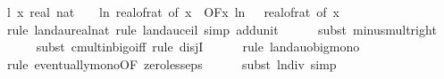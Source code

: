 \begin{isabellebody}
\ l{}{\isacharcolon}{\kern0pt}\ {\isachardoublequoteopen}{\isacharparenleft}{\kern0pt}{\isasymlambda}x{\isachardot}{\kern0pt}\ real\ {\isacharparenleft}{\kern0pt}nat\ {\isasymlceil}{\isacharminus}{\kern0pt}\ {\isacharparenleft}{\kern0pt}{}{}\ {\isacharasterisk}{\kern0pt}\ ln\ {\isacharparenleft}{\kern0pt}real{\isacharunderscore}{\kern0pt}of{\isacharunderscore}{\kern0pt}rat\ {\isacharparenleft}{\kern0pt}{\isasymepsilon}{\isacharunderscore}{\kern0pt}of\ x{\isacharparenright}{\kern0pt}{\isacharparenright}{\kern0pt}{\isacharparenright}{\kern0pt}{\isasymrceil}{\isacharparenright}{\kern0pt}{\isacharparenright}{\kern0pt}\ {\isasymin}\ O{\isacharbrackleft}{\kern0pt}{\isacharquery}{\kern0pt}F{\isacharbrackright}{\kern0pt}{\isacharparenleft}{\kern0pt}{\isasymlambda}x{\isachardot}{\kern0pt}\ ln\ {\isacharparenleft}{\kern0pt}{}\ {\isacharslash}{\kern0pt}\ real{\isacharunderscore}{\kern0pt}of{\isacharunderscore}{\kern0pt}rat\ {\isacharparenleft}{\kern0pt}{\isasymepsilon}{\isacharunderscore}{\kern0pt}of\ x{\isacharparenright}{\kern0pt}{\isacharparenright}{\kern0pt}{\isacharparenright}{\kern0pt}{\isachardoublequoteclose}\isanewline
\ \ \ \ \isamarkupfalse%
\ {\isacharparenleft}{\kern0pt}rule\ landau{\isacharunderscore}{\kern0pt}real{\isacharunderscore}{\kern0pt}nat{\isacharcomma}{\kern0pt}\ rule\ landau{\isacharunderscore}{\kern0pt}ceil{\isacharcomma}{\kern0pt}\ simp\ add{\isacharcolon}{\kern0pt}unit{\isacharunderscore}{\kern0pt}{}{\isacharparenright}{\kern0pt}\isanewline
\ \ \ \ \isamarkupfalse%
\ {\isacharparenleft}{\kern0pt}subst\ minus{\isacharunderscore}{\kern0pt}mult{\isacharunderscore}{\kern0pt}right{\isacharparenright}{\kern0pt}\isanewline
\ \ \ \ \isamarkupfalse%
\ {\isacharparenleft}{\kern0pt}subst\ cmult{\isacharunderscore}{\kern0pt}in{\isacharunderscore}{\kern0pt}bigo{\isacharunderscore}{\kern0pt}iff{\isacharcomma}{\kern0pt}\ rule\ disjI{}{\isacharparenright}{\kern0pt}\isanewline
\ \ \ \ \isamarkupfalse%
\ {\isacharparenleft}{\kern0pt}rule\ landau{\isacharunderscore}{\kern0pt}o{\isachardot}{\kern0pt}big{\isacharunderscore}{\kern0pt}mono{\isacharparenright}{\kern0pt}\isanewline
\ \ \ \ \isamarkupfalse%
\ {\isacharparenleft}{\kern0pt}rule\ eventually{\isacharunderscore}{\kern0pt}mono{\isacharbrackleft}{\kern0pt}OF\ zero{\isacharunderscore}{\kern0pt}less{\isacharunderscore}{\kern0pt}eps{\isacharbrackright}{\kern0pt}{\isacharparenright}{\kern0pt}\isanewline
\ \ \ \ \isamarkupfalse%
\ {\isacharparenleft}{\kern0pt}subst\ ln{\isacharunderscore}{\kern0pt}div{\isacharcomma}{\kern0pt}\ simp{\isacharplus}{\kern0pt}{\isacharparenright}{\kern0pt}\isanewline

\end{isabellebody}
